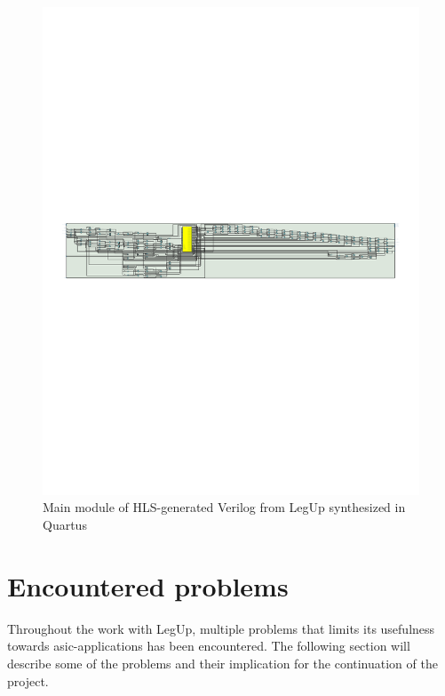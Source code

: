 \begin{figure}[hbpt]
\centering
\includegraphics[trim=1cm 12cm 1cm 12cm,clip=true, width=\textwidth]{../figs/LegUpOutputMain.pdf}
\caption{\label{fig:legupoumain}Main module of HLS-generated Verilog from LegUp synthesized in Quartus}
\end{figure}

\section{\label{sec:encprob}Encountered problems}
Throughout the work with LegUp, multiple problems that limits its usefulness towards \gls{asic}-applications has been encountered. The following section will describe some of the problems and their implication for the continuation of the project.
